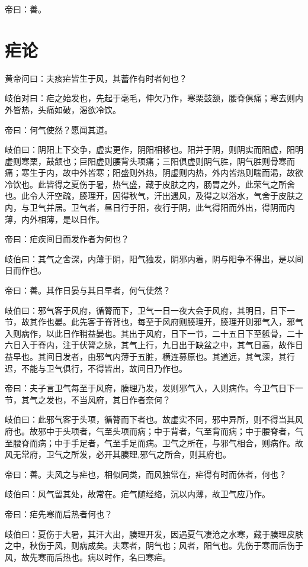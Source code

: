 \documentclass{article}%
\begin{document}
帝曰：善。
\section{疟论}
黄帝问曰：夫痎疟皆生于风，其蓄作有时者何也？

岐伯对曰：疟之始发也，先起于毫毛，伸欠乃作，寒栗鼓颔，腰脊俱痛；寒去则内外皆热，头痛如破，渴欲冷饮。

帝曰：何气使然？愿闻其道。

岐伯曰：阴阳上下交争，虚实更作，阴阳相移也。阳并于阴，则阴实而阳虚，阳明虚则寒栗，鼓颔也；巨阳虚则腰背头项痛；三阳俱虚则阴气胜，阴气胜则骨寒而痛；寒生于内，故中外皆寒；阳盛则外热，阴虚则内热，外内皆热则喘而渴，故欲冷饮也。此皆得之夏伤于暑，热气盛，藏于皮肤之内，肠胃之外，此荣气之所舍也。此令人汗空疏，腠理开，因得秋气，汗出遇风，及得之以浴水，气舍于皮肤之内，与卫气并居。卫气者，昼日行于阳，夜行于阴，此气得阳而外出，得阴而内薄，内外相薄，是以日作。

帝曰：疟疾间日而发作者为何也？

岐伯曰：其气之舍深，内薄于阴，阳气独发，阴邪内着，阴与阳争不得出，是以间日而作也。

帝曰：善。其作日晏与其日早者，何气使然？

岐伯曰：邪气客于风府，循膂而下，卫气一日一夜大会于风府，其明日，日下一节，故其作也晏。此先客于脊背也，每至于风府则腠理开，腠理开则邪气入，邪气入则病作，以此日作稍益晏也。其出于风府，日下一节，二十五日下至骶骨，二十六日入于脊内，注于伏膂之脉，其气上行，九日出于缺盆之中，其气日高，故作日益早也。其间日发者，由邪气内薄于五脏，横连募原也。其道远，其气深，其行迟，不能与卫气俱行，不得皆出，故间日乃作也。

帝曰：夫子言卫气每至于风府，腠理乃发，发则邪气入，入则病作。今卫气日下一节，其气之发也，不当风府，其日作者奈何？

岐伯曰：此邪气客于头项，循膂而下者也。故虚实不同，邪中异所，则不得当其风府也。故邪中于头项者，气至头项而病；中于背者，气至背而病；中于腰脊者，气至腰脊而病；中于手足者，气至手足而病。卫气之所在，与邪气相合，则病作。故风无常府，卫气之所发，必开其腠理,邪气之所合，则其府也。

帝曰：善。夫风之与疟也，相似同类，而风独常在，疟得有时而休者，何也？

岐伯曰：风气留其处，故常在。疟气随经络，沉以内薄，故卫气应乃作。

帝曰：疟先寒而后热者何也？

岐伯曰：夏伤于大暑，其汗大出，腠理开发，因遇夏气凄沧之水寒，藏于腠理皮肤之中，秋伤于风，则病成矣。夫寒者，阴气也；风者，阳气也。先伤于寒而后伤于风，故先寒而后热也。病以时作，名曰寒疟。
\end{document}
